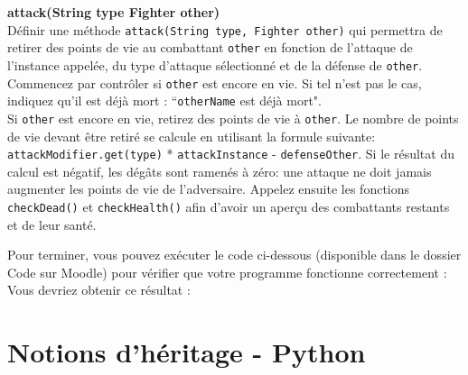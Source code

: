 \begin{Exercice}[10 minutes] \textbf{attack(String type Fighter other)}\\
    Définir une méthode \lstinline{attack(String type, Fighter other)} qui permettra de retirer des points de vie au combattant \lstinline{other} en fonction de l'attaque de l'instance appelée, du type d'attaque sélectionné et de la défense de \lstinline{other}. \\
    
    Commencez par contrôler si \lstinline{other} est encore en vie. Si tel n'est pas le cas, indiquez qu'il est déjà mort : ``\lstinline{otherName} est déjà mort". \\
    Si \lstinline{other} est encore en vie, retirez des points de vie à \lstinline{other}. 
    Le nombre de points de vie devant être retiré se calcule en utilisant la formule suivante: \lstinline{attackModifier.get(type)} * \lstinline{attackInstance} - \lstinline{defenseOther}.
    Si le résultat du calcul est négatif, les dégâts sont ramenés à zéro: une attaque ne doit jamais augmenter les points de vie de l'adversaire. 
    Appelez ensuite les fonctions \lstinline{checkDead()} et \lstinline{checkHealth()} afin d'avoir un aperçu des combattants restants et de leur santé. 
     
\begin{solution}
	
\end{solution}
\end{Exercice}
Pour terminer, vous pouvez exécuter le code ci-dessous (disponible dans le dossier Code sur Moodle) pour vérifier que votre programme fonctionne correctement : \\

Vous devriez obtenir ce résultat : 



\section{Notions d'héritage - Python}


